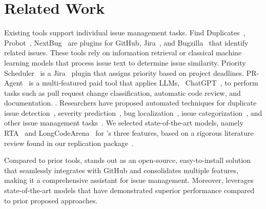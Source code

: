 \section{Related Work}
\label{sec:related_work}

Existing tools support individual issue management tasks. Find Duplicates~\cite{find_duplicates}, Probot~\cite{probot}, NextBug~\cite{rocha2015nextbug} are plugins for GitHub, Jira~\cite{jira}, and Bugzilla~\cite{bugzilla} that identify related issues. These tools rely on information retrieval or classical machine learning models that process issue text to determine issue similarity. Priority Scheduler~\cite{priorityScheduler} is a Jira~\cite{jira} plugin that assigns priority based on project deadlines.  PR-Agent~\cite{pr-agent} is a multi-featured paid tool that applies LLMs, \eg\ ChatGPT~\cite{chatgpt}, to perform tasks such as pull request change classification, automatic code review, and documentation. . Researchers have proposed automated techniques for duplicate issue detection~\cite{fang2023representthemall,zhang2023duplicate,rodrigues2020soft}, severity prediction~\cite{fang2023representthemall,kim2022bug,ali2024bert}, bug localization~\cite{longCodeArena,mahmud2024using}, issue categorization~\cite{somasundaram2012automatic,catolino2019not}, and other issue management tasks~\cite{chaitra2022bug,saha2024toward}. We selected state-of-the-art models, namely RTA~\cite{fang2023representthemall} and LongCodeArena~\cite{longCodeArena} for \toolname's three features, based on a rigorous literature review found in our replication package~\cite{repl_pack}.

Compared to prior tools, \toolname stands out as an open-source, easy-to-install solution that seamlessly integrates with GitHub and consolidates multiple features, making it a comprehensive assistant for issue management.
Moreover, \toolname leverages state-of-the-art models that have demonstrated superior performance compared to prior proposed approaches.

